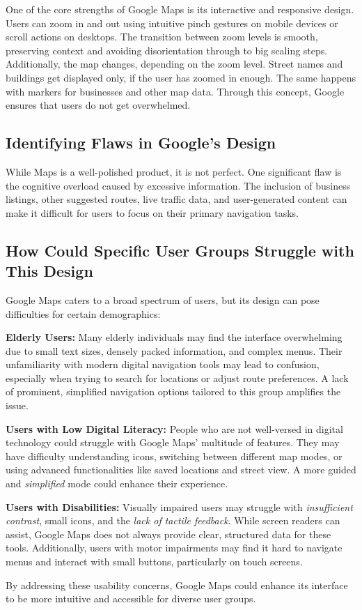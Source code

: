 \blankLine

One of the core strengths of Google Maps is its interactive and responsive design. Users can zoom in and out using intuitive pinch gestures on mobile devices or scroll actions on desktops. The transition between zoom levels is smooth, preserving context and avoiding disorientation through to big scaling steps. Additionally, the map changes, depending on the zoom level. Street names and buildings get displayed only, if the user has zoomed in enough. The same happens with markers for businesses and other map data. Through this concept, Google ensures that users do not get overwhelmed.

\blankLine

\subsection{Identifying Flaws in Google's Design}

While Maps is a well-polished product, it is not perfect. One significant flaw is the cognitive overload caused by excessive information. The inclusion of business listings, other suggested routes, live traffic data, and user-generated content can make it difficult for users to focus on their primary navigation tasks.

\blankLine

\subsection{How Could Specific User Groups Struggle with This Design}

Google Maps caters to a broad spectrum of users, but its design can pose difficulties for certain demographics:
\blankLine

\textbf{Elderly Users:} Many elderly individuals may find the interface overwhelming due to small text sizes, densely packed information, and complex menus. Their unfamiliarity with modern digital navigation tools may lead to confusion, especially when trying to search for locations or adjust route preferences. A lack of prominent, simplified navigation options tailored to this group amplifies the issue.

\textbf{Users with Low Digital Literacy:} People who are not well-versed in digital technology could struggle with Google Maps' multitude of features. They may have difficulty understanding icons, switching between different map modes, or using advanced functionalities like saved locations and street view. A more guided and \textit{simplified} mode could enhance their experience.

\textbf{Users with Disabilities:} Visually impaired users may struggle with \textit{insufficient contrast}, small icons, and the \textit{lack of tactile feedback}. While screen readers can assist, Google Maps does not always provide clear, structured data for these tools. Additionally, users with motor impairments may find it hard to navigate menus and interact with small buttons, particularly on touch screens.

\blankLine

By addressing these usability concerns, Google Maps could enhance its interface to be more intuitive and accessible for diverse user groups.